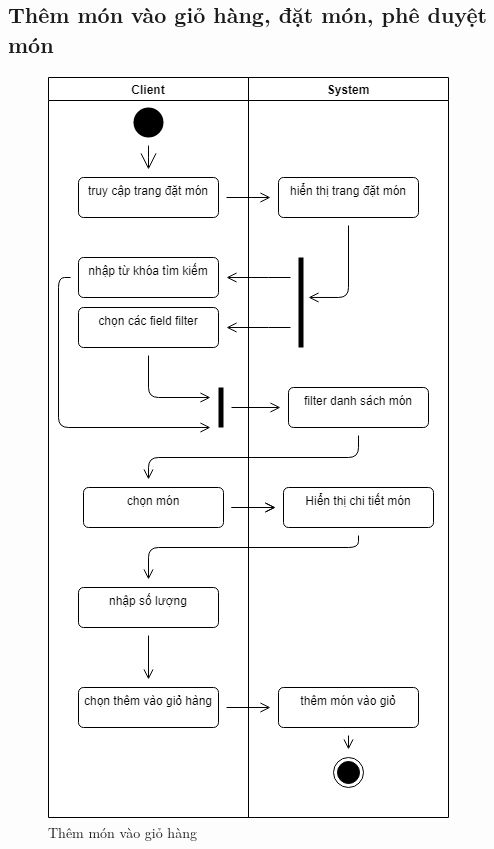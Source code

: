 \newpage
\subsection{Thêm món vào giỏ hàng, đặt món, phê duyệt món}

\begin{figure}[!h]
    \begin{center}
        \includegraphics[scale=0.6]{Images/ActivityDiagram/addToCart.png}
    \end{center}
    \hspace{0.3cm}
    \caption{Thêm món vào giỏ hàng}
\end{figure}

\newpage

